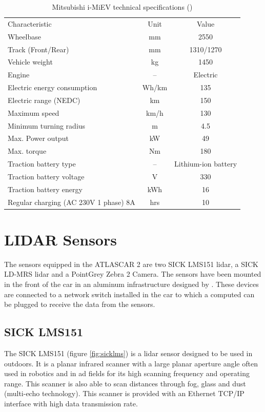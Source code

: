 \begin{table}[!h]
	\centering
	\caption{Mitsubishi i-MiEV technical specifications (\cite{MITSUBISHIMOTORS})}
	\label{tab: MiEV technical}
	\begin{tabular}{lcc}
		Characteristic & Unit & Value\\
		Wheelbase & mm & 2550\\
		Track (Front/Rear) & mm & 1310/1270 \\
		Vehicle weight & kg  & 1450 \\
		\hline
		Engine & -- & Electric \\
		Electric energy consumption & Wh/km & 135 \\
		Electric range (NEDC)  & km & 150 \\
		Maximum speed & km/h & 130 \\
		Minimum turning radius & m & 4.5 \\
		Max. Power output & kW & 49 \\
		Max. torque & Nm & 180 \\
		\hline
		Traction battery type & -- & Lithium-ion battery \\
		Traction battery voltage & V & 330 \\
		Traction battery energy & kWh & 16 \\
		Regular charging (AC 230V 1 phase) 8A & hrs & 10 \\
	\end{tabular}
\end{table}

\section{LIDAR Sensors}

The sensors equipped in the ATLASCAR 2 are two SICK LMS151 \gls{lidar}, a SICK LD-MRS \gls{lidar} and a PointGrey Zebra 2 Camera. The sensors have been mounted in the front of the car in an aluminum infrastructure designed by \cite{Correia2017}. These devices are connected to a network switch installed in the car to which a computed can be plugged to receive the data from the sensors.

\subsection{SICK LMS151}

The SICK LMS151 (figure \ref{fig:sicklms}) is a \gls{lidar} sensor designed to be used in outdoors. It is a planar infrared scanner with a large planar aperture angle often used in robotics and in \gls{ad} fields for its high scanning frequency and operating range. This scanner is also able to scan distances through fog, glass and dust (multi-echo technology). This scanner is provided with an Ethernet TCP/IP interface with high data transmission rate. \cite{SICK}

